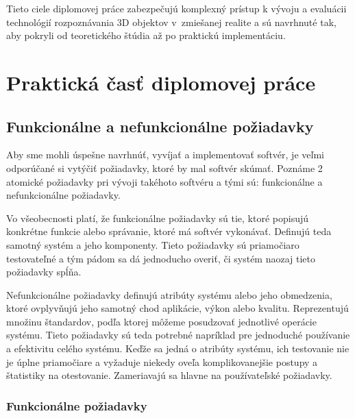 Tieto ciele diplomovej práce zabezpečujú komplexný prístup k vývoju a evaluácii technológií rozpoznávania 3D objektov v~zmiešanej realite a sú navrhnuté tak, aby pokryli od teoretického štúdia až po praktickú implementáciu.

\section{Praktická časť diplomovej práce}

\subsection{Funkcionálne a nefunkcionálne požiadavky}

Aby sme mohli úspešne navrhnúť, vyvíjať a implementovať softvér, je veľmi odporúčané si vytýčiť požiadavky, ktoré by mal softvér skúmať. Poznáme 2 atomické požiadavky pri vývoji takéhoto softvéru a tými sú: funkcionálne a nefunkcionálne požiadavky. 

Vo všeobecnosti platí, že funkcionálne požiadavky sú tie, ktoré popisujú konkrétne funkcie alebo správanie, ktoré má softvér vykonávať. Definujú teda samotný systém a jeho komponenty. Tieto požiadavky sú priamočiaro testovateľné a tým pádom sa dá jednoducho overiť, či systém naozaj tieto požiadavky spĺňa.

Nefunkcionálne požiadavky definujú atribúty systému alebo jeho obmedzenia, ktoré ovplyvňujú jeho samotný chod aplikácie, výkon alebo kvalitu. Reprezentujú množinu štandardov, podľa ktorej môžeme posudzovať jednotlivé operácie systému. Tieto požiadavky sú teda potrebné napríklad pre jednoduché používanie a efektivitu celého systému. Keďže sa jedná o atribúty systému, ich testovanie nie je úplne priamočiare a vyžaduje niekedy oveľa komplikovanejšie postupy a štatistiky na otestovanie. Zameriavajú sa hlavne na používateľské požiadavky.

\subsubsection{Funkcionálne požiadavky}

